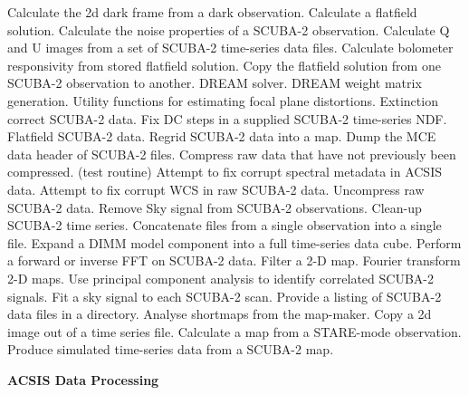 \documentclass[oneside,11pt]{starlink}
\begin{document}
\begin{description}[itemsep=0.pt]
 Calculate the 2d dark frame from a dark observation.
 Calculate a flatfield solution.
Calculate the noise properties of a SCUBA-2 observation.
Calculate Q and U images from a set of SCUBA-2 time-series data files.
 Calculate bolometer responsivity from stored flatfield solution.
Copy the flatfield solution from one SCUBA-2 observation to another.
 DREAM solver.
 DREAM weight matrix generation.
Utility functions for estimating focal plane distortions.
 Extinction correct SCUBA-2 data.
Fix DC steps in a supplied SCUBA-2 time-series NDF.
 Flatfield SCUBA-2 data.
 Regrid SCUBA-2 data into a map.
 Dump the MCE data header of SCUBA-2 files.
  Compress raw data that have not previously been compressed. (test routine)
  Attempt to fix corrupt spectral metadata in ACSIS data.
  Attempt to fix corrupt WCS in raw SCUBA-2 data.
  Uncompress raw SCUBA-2 data.
  Remove Sky signal from SCUBA-2 observations.
 Clean-up SCUBA-2 time series.
 Concatenate files from a single observation into a single file.
  Expand a DIMM model component into a full time-series data cube.
 Perform a forward or inverse FFT on SCUBA-2 data.
  Filter a 2-D map.
  Fourier transform 2-D maps.
  Use principal component analysis to identify correlated SCUBA-2 signals.
  Fit a sky signal to each SCUBA-2 scan.
  Provide a listing of SCUBA-2 data files in a directory.
  Analyse shortmaps from the map-maker.
Copy a 2d image out of a time series file.
 Calculate a map from a STARE-mode observation.
  Produce simulated time-series data from a SCUBA-2 map.
\end{description}

{\large
\begin{center}
\textbf{ACSIS Data Processing}
\end{center}
}
\end{document}

